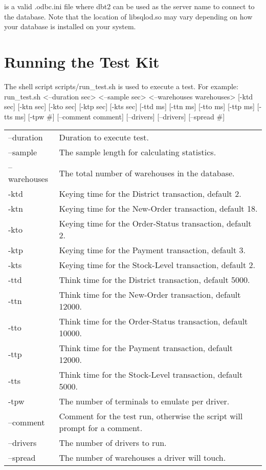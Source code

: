\documentclass{article}
\begin{document}
is a valid .odbc.ini file where dbt2 can be used as the server name to
connect to the database.  Note that the location of libsqlod.so may vary
depending on how your database is installed on your system.

\section{Running the Test Kit}

The shell script scripts/run\_test.sh is used to execute a test.  For example:
	run\_test.sh <--duration sec> <--sample sec> <--warehouses warehouses>
		[-ktd sec] [-ktn sec] [-kto sec] [-ktp sec] [-kts sec] [-ttd ms]
		[-ttn ms] [-tto ms] [-ttp ms] [-tts ms] [-tpw \#] 
		[--comment comment] [--drivers] [--drivers] [--spread \#] \\
\begin{tabular}[c]{ll}
--duration & Duration to execute test. \\
--sample &The sample length for calculating statistics. \\
--warehouses & The total number of warehouses in the database. \\
-ktd & Keying time for the District transaction, default 2. \\
-ktn & Keying time for the New-Order transaction, default 18. \\
-kto & Keying time for the Order-Status transaction, default 2. \\
-ktp & Keying time for the Payment transaction, default 3. \\
-kts & Keying time for the Stock-Level transaction, default 2. \\
-ttd & Think time for the District transaction, default 5000. \\
-ttn & Think time for the New-Order transaction, default 12000. \\
-tto & Think time for the Order-Status transaction, default 10000. \\
-ttp & Think time for the Payment transaction, default 12000. \\
-tts & Think time for the Stock-Level transaction, default 5000. \\
-tpw & The number of terminals to emulate per driver. \\
--comment & Comment for the test run, otherwise the script will prompt for a comment. \\
--drivers & The number of drivers to run. \\
--spread & The number of warehouses a driver will touch. \\
\end{tabular}
\end{document}
